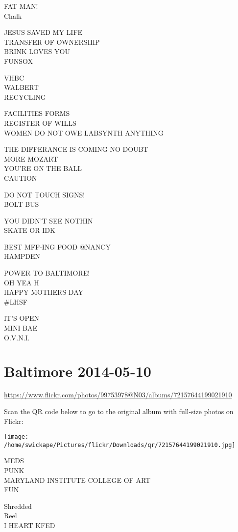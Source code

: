 \documentclass[10pt,letterpaper]{article}
\begin{document}
FAT MAN!\\
Chalk

JESUS SAVED MY LIFE\\
TRANSFER OF OWNERSHIP\\
BRINK LOVES YOU\\
FUNSOX

VHBC\\
WALBERT\\
RECYCLING

FACILITIES FORMS\\
REGISTER OF WILLS\\
WOMEN DO NOT OWE LABSYNTH ANYTHING

THE DIFFERANCE IS COMING NO DOUBT\\
MORE MOZART\\
YOU'RE ON THE BALL\\
CAUTION

DO NOT TOUCH SIGNS!\\
BOLT BUS

YOU DIDN'T SEE NOTHIN\\
SKATE OR IDK

BEST MFF{-}ING FOOD @NANCY\\
HAMPDEN

POWER TO BALTIMORE!\\
OH YEA H\\
HAPPY MOTHERS DAY\\
\#LHSF

IT'S OPEN\\
MINI BAE\\
O.V.N.I.


\section*{Baltimore 2014-05-10}

\url{https://www.flickr.com/photos/99753978@N03/albums/72157644199021910}

Scan the QR code below to go to the original album with full-size photos on Flickr:

\texttt{[image: /home/swickape/Pictures/flickr/Downloads/qr/72157644199021910.jpg]}


MEDS\\
PUNK\\
MARYLAND INSTITUTE COLLEGE OF ART\\
FUN

Shredded\\
Reel\\
I HEART KFED
\end{document}
